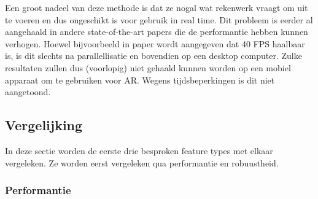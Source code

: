 Een groot nadeel van deze methode is dat ze nogal wat rekenwerk vraagt om uit te voeren en dus ongeschikt is voor gebruik in real time. Dit probleem is eerder al aangehaald in andere state-of-the-art papers die de performantie hebben kunnen verhogen. Hoewel bijvoorbeeld in paper \cite{yan2014fastest} wordt aangegeven dat 40 FPS haalbaar is, is dit slechts na parallellisatie en bovendien op een desktop computer. Zulke resultaten zullen dus (voorlopig) niet gehaald kunnen worden op een mobiel apparaat om te gebruiken voor AR. Wegens tijdsbeperkingen is dit niet aangetoond.

\subsection{Vergelijking}
In deze sectie worden de eerste drie besproken feature types met elkaar vergeleken. Ze worden eerst vergeleken qua performantie en robuustheid.


%
%
%

\subsubsection*{Performantie}

